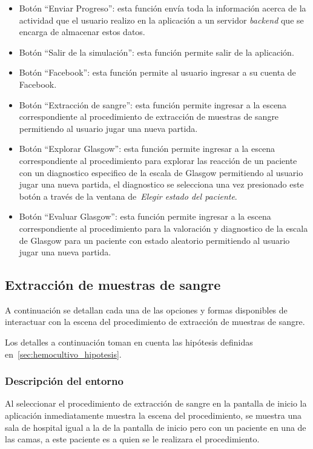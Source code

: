 \begin{itemize}
\item Botón \enquote{Enviar Progreso}: esta función envía toda la información
    acerca de la actividad que el usuario realizo en la aplicación a un servidor
    \emph{backend} que se encarga de almacenar estos datos.
\item Botón \enquote{Salir de la simulación}: esta función permite salir de la
    aplicación.
\item Botón \enquote{Facebook}: esta función permite al usuario ingresar a su
    cuenta de Facebook.
\item Botón \enquote{Extracción de sangre}: esta función permite ingresar a la
    escena correspondiente al procedimiento de extracción de muestras de sangre
    permitiendo al usuario jugar una nueva partida.
\item Botón \enquote{Explorar Glasgow}: esta función permite ingresar a la
    escena correspondiente al procedimiento para explorar las reacción de un
    paciente con un diagnostico especifico de la escala de Glasgow permitiendo
    al usuario jugar una nueva partida, el diagnostico se selecciona una vez
    presionado este botón a través de la ventana de~\emph{Elegir estado del
        paciente}.
\item Botón \enquote{Evaluar Glasgow}: esta función permite ingresar a la escena
    correspondiente al procedimiento para la valoración y diagnostico de la
    escala de Glasgow para un paciente con estado aleatorio permitiendo al
    usuario jugar una nueva partida.
\end{itemize}


\subsection{Extracción de muestras de sangre}

A continuación se detallan cada una de las opciones y formas disponibles de
interactuar con la escena del procedimiento de extracción de muestras de sangre.

Los detalles a continuación toman en cuenta las hipótesis definidas
en~\ref{sec:hemocultivo_hipotesis}. 

\subsubsection{Descripción del entorno}

Al seleccionar el procedimiento de extracción de sangre en la pantalla de inicio 
la aplicación inmediatamente muestra la escena del procedimiento, se muestra una 
sala de hospital igual a la de la pantalla de inicio pero con un paciente en una 
de las camas, a este paciente es a quien se le realizara el procedimiento.

